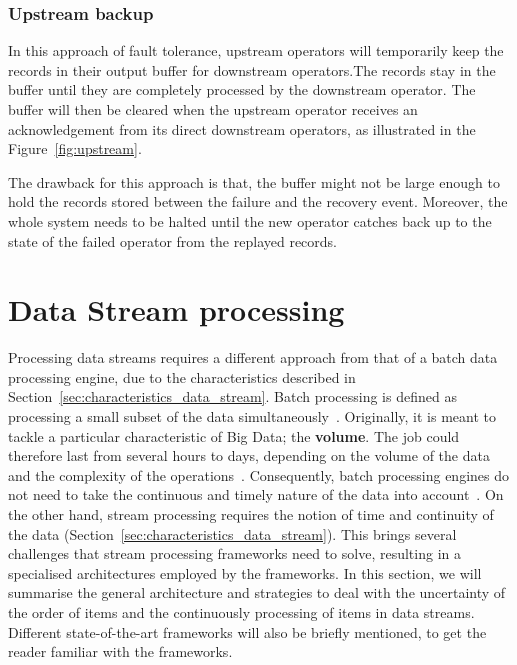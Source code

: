 \subsubsection{Upstream backup}

In this approach of fault tolerance, upstream operators 
will temporarily 
keep the records in their output buffer for downstream operators.The records 
stay in the buffer until they are completely processed by the downstream operator. 
The buffer will then be cleared when the upstream operator receives 
an acknowledgement from its direct downstream operators, as illustrated in the Figure~\ref{fig:upstream}. 

The drawback for this approach is that, the buffer might not be large enough to 
hold the records stored between the failure and the recovery event. Moreover, 
the whole system needs to be halted until the new operator catches back up to 
the state of the failed operator from the replayed records. 

\section{Data Stream processing}

Processing data streams requires a different approach from that of a batch data processing engine, due 
to the characteristics described in Section~\ref{sec:characteristics_data_stream}. 
Batch processing is defined as processing a small subset of the data simultaneously~\cite{batch_processing}. 
Originally, it is meant to tackle a particular characteristic of Big Data; the \textbf{volume}. The job 
could therefore last from several hours to days, depending on the volume of the data and the 
complexity of the operations~\cite{batch_duration}.
Consequently, batch processing engines do not need to take the continuous and 
timely nature of the data into account~\cite{flink}.
On the other hand, stream processing requires the notion of time and continuity of the data 
(Section~\ref{sec:characteristics_data_stream}). This brings several challenges 
that stream processing frameworks need to solve, resulting in a specialised architectures employed by the 
frameworks. In this section, we will summarise the general architecture and strategies to deal with the 
uncertainty of the order of items and the continuously processing of items in data streams. Different 
state-of-the-art frameworks will also be briefly mentioned, to get the reader familiar with the 
frameworks. 

\newpage

